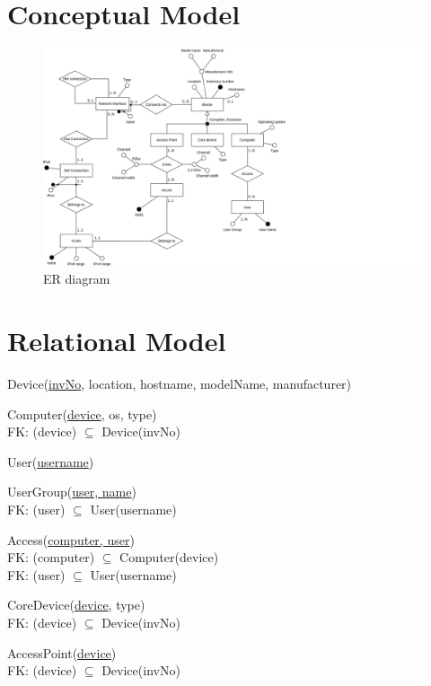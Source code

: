 \documentclass[a4paper,10pt]{article}
\begin{document}
\section{Conceptual Model}
\begin{figure}[H]
\centering
\includegraphics[width=15cm]{er.png}
\caption{ER diagram}
\end{figure}

\section{Relational Model}
Device(\underline{invNo}, location, hostname, modelName, manufacturer)

Computer(\underline{device}, os, type)\\
\hspace*{1em}FK: (device) \(\subseteq\) Device(invNo)

User(\underline{username})

UserGroup(\underline{user, name})\\
\hspace*{1em}FK: (user) \(\subseteq\) User(username)

Access(\underline{computer, user})\\
\hspace*{1em}FK: (computer) \(\subseteq\) Computer(device)\\
\hspace*{1em}FK: (user) \(\subseteq\) User(username)

CoreDevice(\underline{device}, type)\\
\hspace*{1em}FK: (device) \(\subseteq\) Device(invNo)

AccessPoint(\underline{device})\\
\hspace*{1em}FK: (device) \(\subseteq\) Device(invNo)
\end{document}
